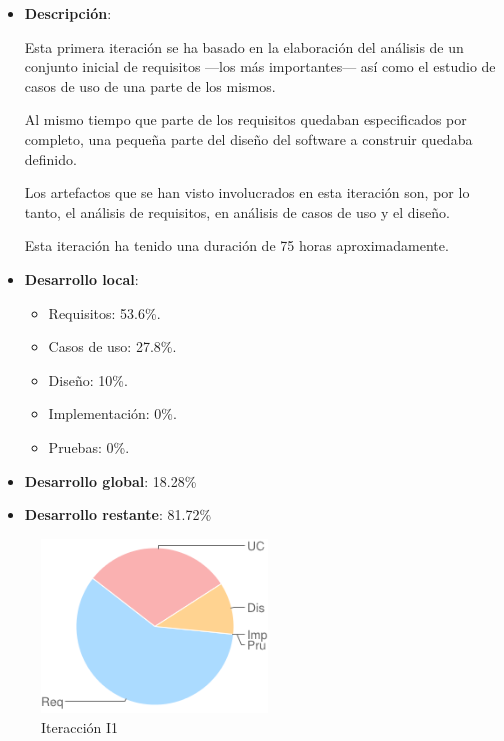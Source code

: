 \begin{itemize}    
\item {\bf Descripción}:

Esta primera iteración se ha basado en la elaboración del análisis de un conjunto inicial de requisitos ---los más importantes--- así como el estudio de casos de uso de una parte de los mismos.

Al mismo tiempo que parte de los requisitos quedaban especificados por completo, una pequeña parte del diseño del software a construir quedaba definido.

Los artefactos que se han visto involucrados en esta iteración son, por lo tanto, el análisis de requisitos, en análisis de casos de uso y el diseño.

Esta iteración ha tenido una duración de 75 horas aproximadamente.
\end{itemize}

\begin{minipage}[c]{0.45\linewidth}
  \begin{itemize}    
  \item {\bf Desarrollo local}:
    \begin{itemize}
    \item Requisitos: 53.6\%.
    \item Casos de uso: 27.8\%.
    \item Diseño: 10\%.
    \item Implementación: 0\%.
    \item Pruebas: 0\%.
    \end{itemize}
  \item {\bf Desarrollo global}: 18.28\%
  \item {\bf Desarrollo restante}: 81.72\%
  \end{itemize}
\end{minipage}
\begin{minipage}[c]{0.45\linewidth}
  \begin{figure}[H]
    \begin{center}
      \includegraphics[width=6cm]{images/i1.png}

      \caption{Iteracción I1}
      \label{fig::i1}
    \end{center}
  \end{figure}
\end{minipage}


